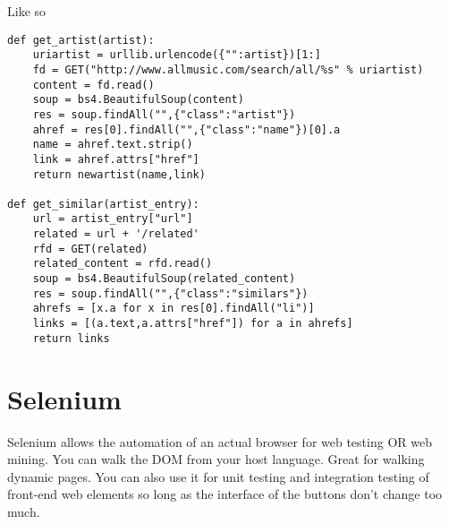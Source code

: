 \documentclass[../CMPUT-404-Notes.tex]{subfiles}
\begin{document}
Like so
\begin{verbatim}
def get_artist(artist):
    uriartist = urllib.urlencode({"":artist})[1:]
    fd = GET("http://www.allmusic.com/search/all/%s" % uriartist)
    content = fd.read()
    soup = bs4.BeautifulSoup(content)
    res = soup.findAll("",{"class":"artist"})
    ahref = res[0].findAll("",{"class":"name"})[0].a
    name = ahref.text.strip()
    link = ahref.attrs["href"]
    return newartist(name,link)

def get_similar(artist_entry):
    url = artist_entry["url"]
    related = url + '/related'
    rfd = GET(related)
    related_content = rfd.read()
    soup = bs4.BeautifulSoup(related_content)
    res = soup.findAll("",{"class":"similars"})
    ahrefs = [x.a for x in res[0].findAll("li")]
    links = [(a.text,a.attrs["href"]) for a in ahrefs]
    return links
\end{verbatim}

\section{Selenium}
Selenium allows the automation of an actual browser for web testing OR web mining.
You can walk the DOM from your host language.
Great for walking dynamic pages.
You can also use it for unit testing and integration testing of front-end web elements so long as the interface of the buttons don't change too much.
\end{document}
